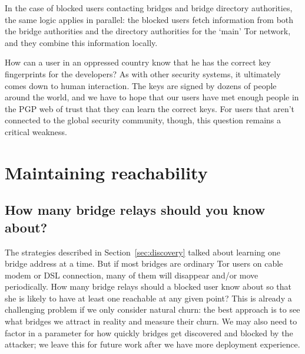\documentclass{llncs}
\begin{document}
In the case of blocked users contacting bridges and bridge directory
authorities, the same logic applies in parallel: the blocked users fetch
information from both the bridge authorities and the directory authorities
for the `main' Tor network, and they combine this information locally.

How can a user in an oppressed country know that he has the correct
key fingerprints for the developers? As with other security systems, it
ultimately comes down to human interaction. The keys are signed by dozens
of people around the world, and we have to hope that our users have met
enough people in the PGP web of trust
that they can learn
the correct keys. For users that aren't connected to the global security
community, though, this question remains a critical weakness.



%
%
%
%

\section{Maintaining reachability}
\label{sec:reachability}

\subsection{How many bridge relays should you know about?}

The strategies described in Section~\ref{sec:discovery} talked about
learning one bridge address at a time. But if most bridges are ordinary
Tor users on cable modem or DSL connection, many of them will disappear
and/or move periodically. How many bridge relays should a blocked user
know about so that she is likely to have at least one reachable at any
given point? This is already a challenging problem if we only consider
natural churn: the best approach is to see what bridges we attract in
reality and measure their churn. We may also need to factor in a parameter
for how quickly bridges get discovered and blocked by the attacker;
we leave this for future work after we have more deployment experience.
\end{document}

